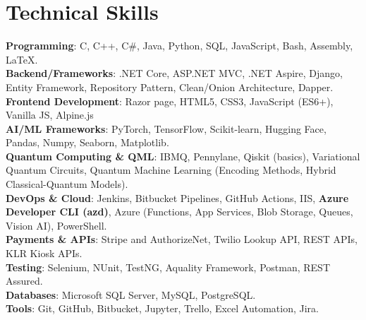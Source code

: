 \section{Technical Skills}
    \begin{itemize}[leftmargin=0.15in, label={}]
	\small{\item{
		\textbf{Programming}{: C, C++, C\#, Java, Python, SQL, JavaScript, Bash, Assembly, \LaTeX.} \\
		\textbf{Backend/Frameworks}{: .NET Core, ASP.NET MVC, .NET Aspire, Django, Entity Framework, Repository Pattern, Clean/Onion Architecture, Dapper.} \\
        \textbf{Frontend Development}{: Razor page, HTML5, CSS3, JavaScript (ES6+), Vanilla JS, Alpine.js} \\
		\textbf{AI/ML Frameworks}{: PyTorch, TensorFlow, Scikit-learn, Hugging Face, Pandas, Numpy, Seaborn, Matplotlib.} \\
		\textbf{Quantum Computing \& QML}{: IBMQ, Pennylane, Qiskit (basics), Variational Quantum Circuits, Quantum Machine Learning (Encoding Methods, Hybrid Classical-Quantum Models).} \\
		\textbf{DevOps \& Cloud}{: Jenkins, Bitbucket Pipelines, GitHub Actions, IIS, \textbf{Azure Developer CLI (azd)}, Azure (Functions, App Services, Blob Storage, Queues, Vision AI), PowerShell.} \\
		\textbf{Payments \& APIs}{: Stripe and AuthorizeNet, Twilio Lookup API, REST APIs, KLR Kiosk APIs.} \\
		\textbf{Testing}{: Selenium, NUnit, TestNG, Aquality Framework, Postman, REST Assured.} \\
		\textbf{Databases}{: Microsoft SQL Server, MySQL, PostgreSQL.} \\
		\textbf{Tools}{: Git, GitHub, Bitbucket, Jupyter, Trello, Excel Automation, Jira.}
	}}
    \end{itemize}

